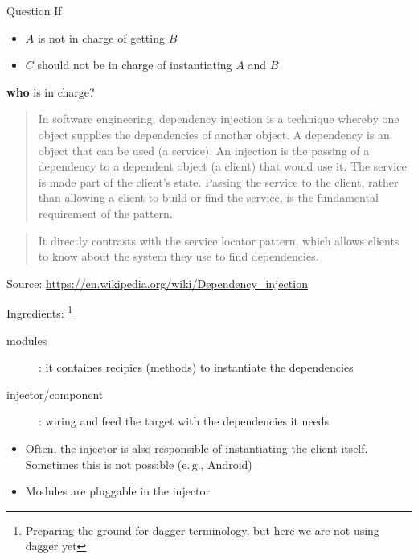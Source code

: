 \documentclass[10pt]{beamer}
\providecommand{\eg}{e.\,g.}
\begin{document}
\begin{frame}[fragile]
	\begin{alertblock}{Question}
If 
		\begin{itemize}
			\item $A$ is not in charge of getting $B$
			\item $C$ should not be in charge of instantiating $A$ and $B$  
		\end{itemize}
		\textbf{who} is in charge?
	\end{alertblock}
\end{frame}
\begin{frame}[fragile]
	\begin{quotation}
		In software engineering, dependency injection is a technique whereby one object supplies the dependencies of another object. A dependency is an object that can be used (a service). An injection is the passing of a dependency to a dependent object (a client) that would use it. The service is made part of the client's state. Passing the service to the client, rather than allowing a client to build or find the service, is the fundamental requirement of the pattern.
	\end{quotation}
	\begin{quotation}
		It directly contrasts with the service locator pattern, which allows clients to know about the system they use to find dependencies.
	\end{quotation}
	Source: \url{https://en.wikipedia.org/wiki/Dependency_injection}
\end{frame}
\begin{frame}[fragile]
	Ingredients:%
	\footnote{Preparing the ground for dagger terminology, but here we are not using dagger yet}
	\begin{description}
		\item[modules]: it containes recipies (methods) to instantiate the dependencies 
		\item[injector/component]: wiring  and feed the target with the dependencies it needs 
	\end{description}

		\begin{figure}
			\centering
{}
		\end{figure}

		\begin{itemize}
			\item 
	Often, the injector is also responsible of instantiating the client itself. 
	Sometimes this is not possible (\eg, Android)
\item Modules are pluggable in the injector 
		\end{itemize}
\end{frame}
\end{document}
